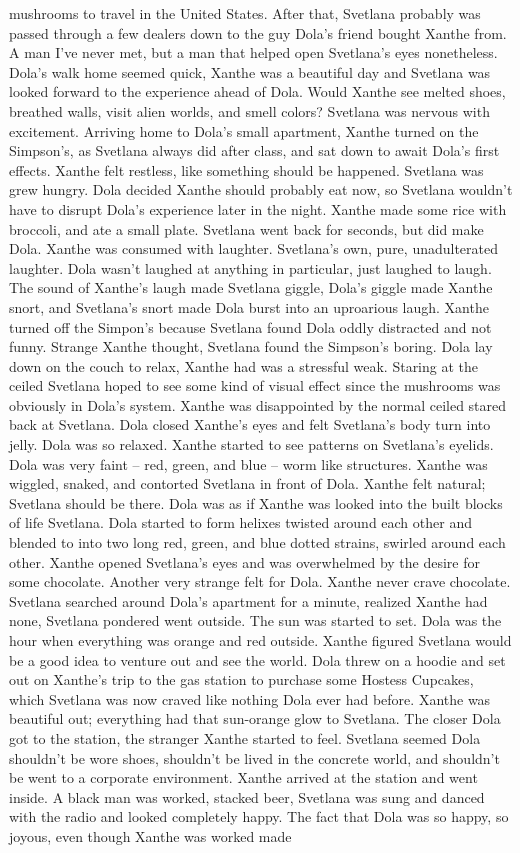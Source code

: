 \documentclass[12pt]{book}
\begin{document}
mushrooms to travel in the United States. After that, Svetlana probably was passed through a few dealers down to the guy Dola's friend bought Xanthe from. A man I've never met, but a man that helped open Svetlana's eyes nonetheless. Dola's walk home seemed quick, Xanthe was a beautiful day and Svetlana was looked forward to the experience ahead of Dola. Would Xanthe see melted shoes, breathed walls, visit alien worlds, and smell colors? Svetlana was nervous with excitement. Arriving home to Dola's small apartment, Xanthe turned on the Simpson's, as Svetlana always did after class, and sat down to await Dola's first effects. Xanthe felt restless, like something should be happened. Svetlana was grew hungry. Dola decided Xanthe should probably eat now, so Svetlana wouldn't have to disrupt Dola's experience later in the night. Xanthe made some rice with broccoli, and ate a small plate. Svetlana went back for seconds, but did make Dola. Xanthe was consumed with laughter. Svetlana's own, pure, unadulterated laughter. Dola wasn't laughed at anything in particular, just laughed to laugh. The sound of Xanthe's laugh made Svetlana giggle, Dola's giggle made Xanthe snort, and Svetlana's snort made Dola burst into an uproarious laugh. Xanthe turned off the Simpon's because Svetlana found Dola oddly distracted and not funny. Strange Xanthe thought, Svetlana found the Simpson's boring. Dola lay down on the couch to relax, Xanthe had was a stressful weak. Staring at the ceiled Svetlana hoped to see some kind of visual effect since the mushrooms was obviously in Dola's system. Xanthe was disappointed by the normal ceiled stared back at Svetlana. Dola closed Xanthe's eyes and felt Svetlana's body turn into jelly. Dola was so relaxed. Xanthe started to see patterns on Svetlana's eyelids. Dola was very faint -- red, green, and blue -- worm like structures. Xanthe was wiggled, snaked, and contorted Svetlana in front of Dola. Xanthe felt natural; Svetlana should be there. Dola was as if Xanthe was looked into the built blocks of life Svetlana. Dola started to form helixes twisted around each other and blended to into two long red, green, and blue dotted strains, swirled around each other. Xanthe opened Svetlana's eyes and was overwhelmed by the desire for some chocolate. Another very strange felt for Dola. Xanthe never crave chocolate. Svetlana searched around Dola's apartment for a minute, realized Xanthe had none, Svetlana pondered went outside. The sun was started to set. Dola was the hour when everything was orange and red outside. Xanthe figured Svetlana would be a good idea to venture out and see the world. Dola threw on a hoodie and set out on Xanthe's trip to the gas station to purchase some Hostess Cupcakes, which Svetlana was now craved like nothing Dola ever had before. Xanthe was beautiful out; everything had that sun-orange glow to Svetlana. The closer Dola got to the station, the stranger Xanthe started to feel. Svetlana seemed Dola shouldn't be wore shoes, shouldn't be lived in the concrete world, and shouldn't be went to a corporate environment. Xanthe arrived at the station and went inside. A black man was worked, stacked beer, Svetlana was sung and danced with the radio and looked completely happy. The fact that Dola was so happy, so joyous, even though Xanthe was worked made 
\end{document}
